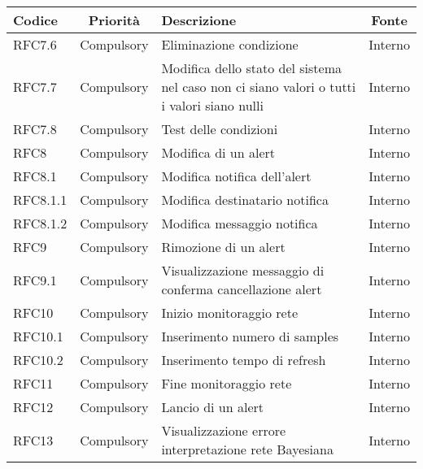         \begin{table}[!htpb]
            \centering
            \renewcommand{\arraystretch}{1.5} %
            \begin{tabular}{|l|c|p{9cm}|c|}
                \rowcolor{orange!50}
        		\hline
        		\textbf{Codice} & \textbf{Priorità} & \textbf{Descrizione} & \textbf{Fonte}\\
                \hline
                RFC7.6 & Compulsory & Eliminazione condizione & Interno\\
                \hline
                RFC7.7 & Compulsory & Modifica dello stato del sistema nel caso non ci siano valori o tutti i valori siano nulli & Interno\\
                \hline
                RFC7.8 & Compulsory & Test delle condizioni & Interno\\
                \hline
                RFC8 & Compulsory & Modifica di un alert & Interno\\
                \hline
                RFC8.1 & Compulsory & Modifica notifica dell'alert & Interno\\
                \hline
                RFC8.1.1 & Compulsory & Modifica destinatario notifica & Interno\\
                \hline
                RFC8.1.2 & Compulsory & Modifica messaggio notifica & Interno\\
                \hline
                RFC9 & Compulsory & Rimozione di un alert & Interno\\
                \hline
                RFC9.1 & Compulsory & Visualizzazione messaggio di conferma cancellazione alert & Interno\\
                \hline
                RFC10 & Compulsory & Inizio monitoraggio rete & Interno\\
                \hline
                RFC10.1 & Compulsory & Inserimento numero di samples & Interno\\
                \hline
                RFC10.2 & Compulsory & Inserimento tempo di refresh & Interno\\
                \hline
                RFC11 & Compulsory & Fine monitoraggio rete & Interno\\
                \hline
                RFC12 & Compulsory & Lancio di un alert & Interno\\
                \hline
                RFC13 & Compulsory & Visualizzazione errore interpretazione rete Bayesiana & Interno\\

\end{tabular}
\end{table}
